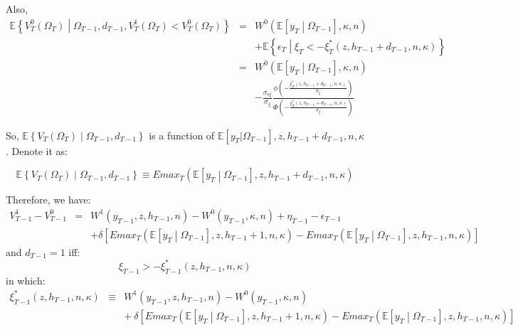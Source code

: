 \noindent Also,
\begin{eqnarray*}
\mathbb{E} \left\{ V^{0}_T\left(\Omega_T\right) \middle| \Omega_{T-1}, d_{T-1}, V^{1}_T\left(\Omega_T\right) < V^{0}_T\left(\Omega_T\right) \right\}
&=& W^0\left(\mathbb{E} [y_T \middle| \Omega_{T-1}], \kappa, n\right) \\
& & + \mathbb{E} \left\{\epsilon_T \middle| \xi_T < -\xi^*_T\left(z, h_{T-1} + d_{T-1}, n, \kappa \right) \right\}\\
&=& W^0\left(\mathbb{E} [y_T \middle| \Omega_{T-1}], \kappa, n\right) \\
& & - \frac{\sigma_{\epsilon \xi}}{\sigma_\xi} \frac{\phi\left(-\frac{\xi^*_T\left(z,h_{T-1}+d_{T-1},n,\kappa\right)}{\sigma_\xi}\right)}{\Phi\left(-\frac{\xi^*_T\left(z,h_{T-1}+d_{T-1},n,\kappa\right)}{\sigma_\xi}\right)}
\end{eqnarray*}

\noindent So, $\mathbb{E} \left\{ V_T\left(\Omega_T\right) \middle| \Omega_{T-1}, d_{T-1}\right\}$ is a function of $\mathbb{E} [y_T | \Omega_{T-1}], z, h_{T-1}+d_{T-1}, n, \kappa$. Denote it as:

\begin{equation*}
\mathbb{E} \left\{ V_T\left(\Omega_T\right) \middle| \Omega_{T-1}, d_{T-1}\right\} \equiv Emax_T\left(\mathbb{E} [y_T \middle| \Omega_{T-1}],z,h_{T-1}+d_{T-1},n,\kappa\right)
\end{equation*}

Therefore, we have:
\begin{eqnarray*}
V^1_{T-1} - V^0_{T-1} &=& W^1\left(y_{T-1}, z, h_{T-1}, n\right) - W^0\left(y_{T-1},\kappa, n\right) + \eta_{T-1} - \epsilon_{T-1}\\
& & + \delta [ Emax_T\left(\mathbb{E} [y_T \middle| \Omega_{T-1}], z, h_{T-1}+1, n, \kappa\right) - Emax_T\left(\mathbb{E} [y_T \middle| \Omega_{T-1}], z, h_{T-1}, n, \kappa \right)]
\end{eqnarray*}
\noindent and $d_{T-1} = 1$ iff:
\begin{equation*}
\xi_{T-1} > -\xi^*_{T-1}\left(z, h_{T-1}, n, \kappa\right)
\end{equation*}
in which:
\begin{eqnarray*}
\xi^*_{T-1}\left(z, h_{T-1}, n, \kappa \right) &\equiv & W^1\left(y_{T-1}, z, h_{T-1}, n\right) - W^0\left(y_{T-1},\kappa, n\right)\\
& &+\ \delta [ Emax_T\left(\mathbb{E} [y_T \middle| \Omega_{T-1}], z, h_{T-1}+1, n, \kappa\right) - Emax_T\left(\mathbb{E} [y_T \middle| \Omega_{T-1}], z, h_{T-1}, n, \kappa \right)] 
\end{eqnarray*}

